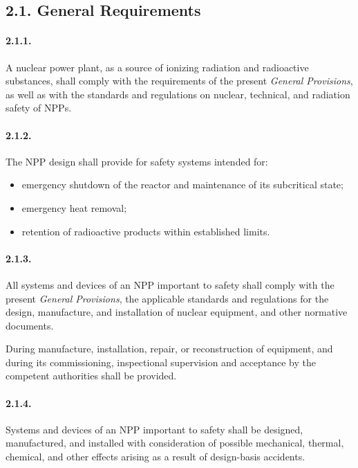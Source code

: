 \documentclass[openright]{bookest}
\begin{document}
\subsection*{2.1. General Requirements}

\paragraph{2.1.1.}
A nuclear power plant, as a source of ionizing radiation and radioactive substances, shall comply with the requirements of the present \textit{General Provisions}, as well as with the standards and regulations on nuclear, technical, and radiation safety of NPPs.

\paragraph{2.1.2.}
The NPP design shall provide for safety systems intended for:
\begin{itemize}
    \item emergency shutdown of the reactor and maintenance of its subcritical state;
    \item emergency heat removal;
    \item retention of radioactive products within established limits.
\end{itemize}

\paragraph{2.1.3.}
All systems and devices of an NPP important to safety shall comply with the present \textit{General Provisions}, the applicable standards and regulations for the design, manufacture, and installation of nuclear equipment, and other normative documents.

During manufacture, installation, repair, or reconstruction of equipment, and during its commissioning, inspectional supervision and acceptance by the competent authorities shall be provided.

\paragraph{2.1.4.}
Systems and devices of an NPP important to safety shall be designed, manufactured, and installed with consideration of possible mechanical, thermal, chemical, and other effects arising as a result of design-basis accidents.
\end{document}
